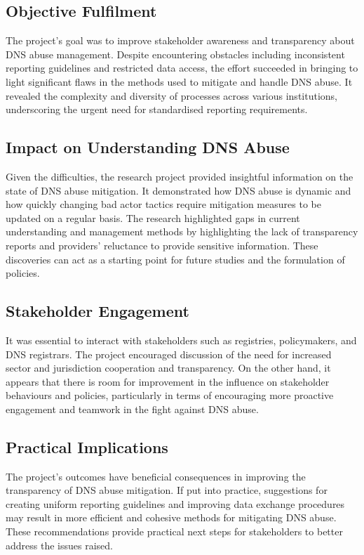 \subsection{Objective Fulfilment}

The project's goal was to improve stakeholder awareness and transparency about DNS abuse management. Despite encountering obstacles including inconsistent reporting guidelines and restricted data access, the effort succeeded in bringing to light significant flaws in the methods used to mitigate and handle DNS abuse. It revealed the complexity and diversity of processes across various institutions, underscoring the urgent need for standardised reporting requirements.

\subsection{Impact on Understanding DNS Abuse}

Given the difficulties, the research project provided insightful information on the state of DNS abuse mitigation. It demonstrated how DNS abuse is dynamic and how quickly changing bad actor tactics require mitigation measures to be updated on a regular basis. The research highlighted gaps in current understanding and management methods by highlighting the lack of transparency reports and providers' reluctance to provide sensitive information. These discoveries can act as a starting point for future studies and the formulation of policies.

\subsection{Stakeholder Engagement}

It was essential to interact with stakeholders such as registries, policymakers, and DNS registrars. The project encouraged discussion of the need for increased sector and jurisdiction cooperation and transparency. On the other hand, it appears that there is room for improvement in the influence on stakeholder behaviours and policies, particularly in terms of encouraging more proactive engagement and teamwork in the fight against DNS abuse.

\subsection{Practical Implications}
The project's outcomes have beneficial consequences in improving the transparency of DNS abuse mitigation. If put into practice, suggestions for creating uniform reporting guidelines and improving data exchange procedures may result in more efficient and cohesive methods for mitigating DNS abuse. These recommendations provide practical next steps for stakeholders to better address the issues raised.


